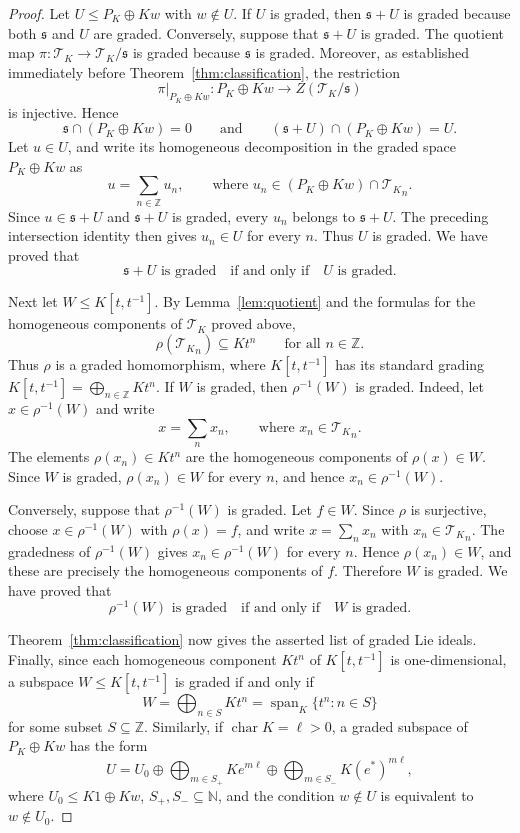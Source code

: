 \documentclass[10pt,a4paper]{amsart}
\newcommand{\T}{\mathscr T_K}
\begin{document}
\begin{proof}
Let $U\leq P_K\oplus Kw$ with $w\notin U$. If $U$ is graded, then $\mathfrak s+U$ is graded because both $\mathfrak s$ and $U$ are graded. Conversely, suppose that $\mathfrak s+U$ is graded. The quotient map $\pi:\T\to\T/\mathfrak s$ is graded because $\mathfrak s$ is graded. Moreover, as established immediately before Theorem~\ref{thm:classification}, the restriction
$$
\pi|_{P_K\oplus Kw}:P_K\oplus Kw\longrightarrow Z(\T/\mathfrak s)
$$
is injective. Hence
$$
\mathfrak s\cap(P_K\oplus Kw)=0
\qquad\text{and}\qquad
(\mathfrak s+U)\cap(P_K\oplus Kw)=U.
$$
Let $u\in U$, and write its homogeneous decomposition in the graded space $P_K\oplus Kw$ as
$$
u=\sum_{n\in\mathbb Z}u_n,\qquad\text{where } u_n\in(P_K\oplus Kw)\cap{\T}_n.
$$
Since $u\in\mathfrak s+U$ and $\mathfrak s+U$ is graded, every $u_n$ belongs to $\mathfrak s+U$. The preceding intersection identity then gives $u_n\in U$ for every $n$. Thus $U$ is graded. We have proved that
$$
\mathfrak s+U\text{ is graded}
\quad\text{if and only if}\quad
U\text{ is graded}.
$$

Next let $W\leq K[t,t^{-1}]$. By Lemma~\ref{lem:quotient} and the formulas for the homogeneous components of $\T$ proved above,
$$
\rho({\T}_n)\subseteq Kt^n\qquad\text{for all }n\in\mathbb Z.
$$
Thus $\rho$ is a graded homomorphism, where $K[t,t^{-1}]$ has its standard grading $K[t,t^{-1}]=\bigoplus_{n\in\mathbb Z}Kt^n$. If $W$ is graded, then $\rho^{-1}(W)$ is graded. Indeed, let $x\in\rho^{-1}(W)$ and write
$$
x=\sum_n x_n,\qquad\text{where } x_n\in{\T}_n.
$$
The elements $\rho(x_n)\in Kt^n$ are the homogeneous components of $\rho(x)\in W$. Since $W$ is graded, $\rho(x_n)\in W$ for every $n$, and hence $x_n\in\rho^{-1}(W)$.

Conversely, suppose that $\rho^{-1}(W)$ is graded. Let $f\in W$. Since $\rho$ is surjective, choose $x\in\rho^{-1}(W)$ with $\rho(x)=f$, and write $x=\sum_nx_n$ with $x_n\in{\T}_n$. The gradedness of $\rho^{-1}(W)$ gives $x_n\in\rho^{-1}(W)$ for every $n$. Hence $\rho(x_n)\in W$, and these are precisely the homogeneous components of $f$. Therefore $W$ is graded. We have proved that
$$
\rho^{-1}(W)\text{ is graded}
\quad\text{if and only if}\quad
W\text{ is graded}.
$$

Theorem~\ref{thm:classification} now gives the asserted list of graded Lie ideals. Finally, since each homogeneous component $Kt^n$ of $K[t,t^{-1}]$ is one-dimensional, a subspace $W\leq K[t,t^{-1}]$ is graded if and only if
$$
W=\bigoplus_{n\in S}Kt^n
=\operatorname{span}_K\{t^n:n\in S\}
$$
for some subset $S\subseteq\mathbb Z$. Similarly, if $\operatorname{char}K=\ell>0$, a graded subspace of $P_K\oplus Kw$ has the form
$$
U=U_0
\oplus\bigoplus_{m\in S_+}Ke^{m\ell}
\oplus\bigoplus_{m\in S_-}K(e^*)^{m\ell},
$$
where $U_0\leq K1\oplus Kw$, $S_+,S_-\subseteq\mathbb N$, and the condition $w\notin U$ is equivalent to $w\notin U_0$.
\end{proof}
\end{document}
